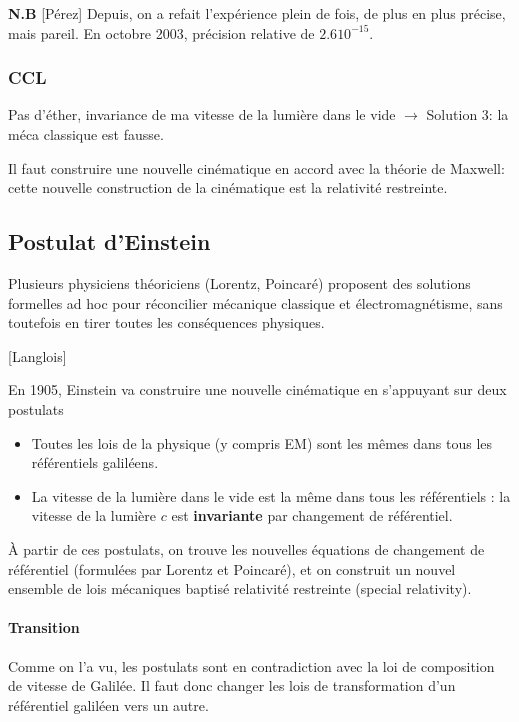 \documentclass[11pt]{report}
\numberwithin{figure}{section}
\numberwithin{equation}{section}
\numberwithin{table}{section}
\newcommand{\1}{\boldsymbol{1}}
\begin{document}
\textbf{N.B} [Pérez] Depuis, on a refait l'expérience plein de fois, de plus en plus précise, mais pareil. En octobre 2003, précision relative de $2.6 10^{-15}$.


\subsubsection{CCL}

Pas d'éther, invariance de ma vitesse de la lumière dans le vide $\rightarrow$ Solution 3: la méca classique est fausse. 

Il faut construire une nouvelle cinématique en accord avec la théorie de Maxwell: cette nouvelle construction de la cinématique est la relativité restreinte.

  
\subsection{Postulat d'Einstein}

Plusieurs physiciens théoriciens (Lorentz, Poincaré) proposent des solutions formelles ad hoc pour réconcilier mécanique classique et électromagnétisme, sans toutefois en tirer toutes les conséquences physiques.

[Langlois]

En 1905, Einstein va construire une nouvelle cinématique en s'appuyant sur deux postulats
\begin{itemize}
\item Toutes les lois de la physique (y compris EM) sont les mêmes dans tous les référentiels galiléens.
\item La vitesse de la lumière dans le vide est la même dans tous les référentiels : la vitesse de la lumière $c$ est \textbf{invariante} par changement de référentiel.
\end{itemize}

À partir de ces postulats, on trouve les nouvelles équations de changement de référentiel (formulées
par Lorentz et Poincaré), et on construit un nouvel ensemble de lois mécaniques baptisé relativité restreinte (special relativity).

\paragraph{Transition} Comme on l'a vu, les postulats sont en contradiction avec la loi de composition de vitesse de Galilée. Il faut donc changer les lois de transformation d'un référentiel galiléen vers un autre.
  
\end{document}
